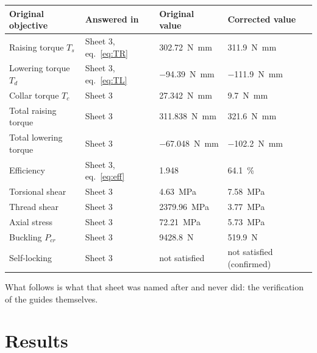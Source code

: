 \documentclass[11pt]{article}
\begin{document}
\begin{center}\small
\begin{tabular}{@{}l>{\raggedright\arraybackslash}p{4.6cm}l l@{}}
\toprule
\textbf{Original objective} & \textbf{Answered in} & \textbf{Original value} & \textbf{Corrected value} \\
\midrule
Raising torque $T_s$        & Sheet 3, eq.~\eqref{eq:TR} & \SI{302.72}{\newton\milli\metre} & \SI{311.9}{\newton\milli\metre} \\
Lowering torque $T_d$       & Sheet 3, eq.~\eqref{eq:TL} & \SI{-94.39}{\newton\milli\metre} & \SI{-111.9}{\newton\milli\metre} \\
Collar torque $T_c$         & Sheet 3                    & \SI{27.342}{\newton\milli\metre} & \SI{9.7}{\newton\milli\metre} \\
Total raising torque        & Sheet 3                    & \SI{311.838}{\newton\milli\metre} & \SI{321.6}{\newton\milli\metre} \\
Total lowering torque       & Sheet 3                    & \SI{-67.048}{\newton\milli\metre} & \SI{-102.2}{\newton\milli\metre} \\
Efficiency                  & Sheet 3, eq.~\eqref{eq:eff} & 1.948 & \SI{64.1}{\percent} \\
Torsional shear             & Sheet 3                    & \SI{4.63}{\mega\pascal} & \SI{7.58}{\mega\pascal} \\
Thread shear                & Sheet 3                    & \SI{2379.96}{\mega\pascal} & \SI{3.77}{\mega\pascal} \\
Axial stress                & Sheet 3                    & \SI{72.21}{\mega\pascal} & \SI{5.73}{\mega\pascal} \\
Buckling $P_{cr}$           & Sheet 3                    & \SI{9428.8}{\newton} & \SI{519.9}{\newton} \\
Self-locking                & Sheet 3                    & not satisfied & not satisfied (confirmed) \\
\bottomrule
\end{tabular}
\end{center}

What follows is what that sheet was named after and never did: the verification of the
guides themselves.

\section{Results}\label{sec:gui-res}
\end{document}
